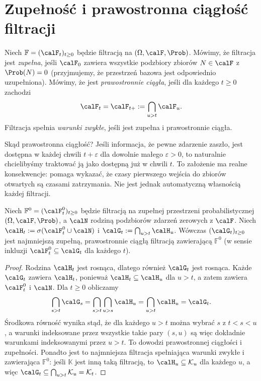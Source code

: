\section{Zupełność i prawostronna ciągłość filtracji}
\begin{definicja}
Niech $\mathbb F=(\calF_t)_{t\ge0}$ będzie filtracją
na $(\Omega,\calF,\Prob)$. Mówimy, że filtracja jest
\emph{zupełna}, jeśli $\calF_0$ zawiera wszystkie
podzbiory zbiorów $N\in\calF$ z $\Prob(N)=0$
(przyjmujemy, że przestrzeń bazowa jest odpowiednio uzupełniona).
Mówimy, że jest \emph{prawostronnie ciągła}, jeśli
dla każdego $t\ge0$ zachodzi
\[
\calF_t=\calF_{t+}:=\bigcap_{u>t}\calF_u.
\]
Filtracja spełnia \emph{warunki zwykłe}, jeśli jest
zupełna i prawostronnie ciągła.
\end{definicja}

Skąd prawostronna ciągłość? Jeśli informacja, że pewne
zdarzenie zaszło, jest dostępna w każdej chwili
$t+\varepsilon$ dla dowolnie małego $\varepsilon>0$,
to naturalnie chcielibyśmy traktować ją jako dostępną
już w chwili $t$. To założenie ma realne konsekwencje:
pomaga wykazać, że czasy pierwszego wejścia do
zbiorów otwartych są czasami zatrzymania.
Nie jest jednak automatyczną własnością każdej filtracji.

\begin{stwierdzenie}
Niech $\mathbb F^0=(\calF_t^0)_{t\ge0}$ będzie
filtracją na zupełnej przestrzeni probabilistycznej
$(\Omega,\calF,\Prob)$, a $\calN$ rodziną podzbiorów
zdarzeń zerowych z $\calF$. Niech
$\calH_t:=\sigma(\calF_t^0\cup\calN)$ i
$\calG_t:=\bigcap_{u>t}\calH_u$.
Wówczas $(\calG_t)_{t\ge0}$ jest najmniejszą zupełną,
prawostronnie ciągłą filtracją zawierającą
$\mathbb F^0$ (w sensie inkluzji $\calF_t^0\subseteq\calG_t$
dla każdego $t$).
\end{stwierdzenie}
\begin{proof}
Rodzina $\calH_t$ jest rosnąca, dlatego również
$\calG_t$ jest rosnąca. Każde $\calG_t$ zawiera
$\calH_t$, ponieważ $\calH_t\subseteq\calH_u$
dla $u>t$, a zatem zawiera $\calF_t^0$ i $\calN$.
Dla $t\ge0$ obliczamy
\[
\bigcap_{s>t}\calG_s
=\bigcap_{s>t}\bigcap_{u>s}\calH_u
=\bigcap_{u>t}\calH_u=\calG_t.
\]
Środkowa równość wynika stąd, że dla każdego $u>t$
można wybrać $s$ z $t<s<u$, a warunki indeksowane
przez wszystkie takie pary $(s,u)$ są więc dokładnie
warunkami indeksowanymi przez $u>t$.
To dowodzi prawostronnej ciągłości i zupełności.
Ponadto jest to najmniejsza filtracja spełniająca
warunki zwykłe i zawierająca $\mathbb F^0$:
jeśli $\mathbb K$ jest inną taką filtracją, to
$\calH_u\subseteq\mathcal{K}_u$ dla każdego $u$, a więc
$\calG_t\subseteq\bigcap_{u>t}\mathcal{K}_u=\mathcal{K}_t$.
\end{proof}

